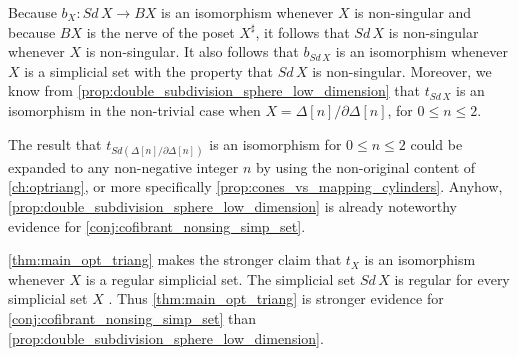 Because $b_X:Sd\, X\to BX$ is an isomorphism whenever $X$ is non-singular and because $BX$ is the nerve of the poset $X^\sharp$, it follows that $Sd\, X$ is non-singular whenever $X$ is non-singular. It also follows that $b_{Sd\, X}$ is an isomorphism whenever $X$ is a simplicial set with the property that $Sd\, X$ is non-singular. Moreover, we know from \cref{prop:double_subdivision_sphere_low_dimension} that $t_{Sd\, X}$ is an isomorphism in the non-trivial case when $X=\Delta [n]/\partial \Delta [n]$, for $0\leq n\leq 2$.

The result that $t_{Sd(\Delta [n]/\partial \Delta [n])}$ is an isomorphism for $0\leq n\leq 2$ could be expanded to any non-negative integer $n$ by using the non-original content of \cref{ch:optriang}, or more specifically \cref{prop:cones_vs_mapping_cylinders}. Anyhow, \cref{prop:double_subdivision_sphere_low_dimension} is already noteworthy evidence for \cref{conj:cofibrant_nonsing_simp_set}.

\cref{thm:main_opt_triang} makes the stronger claim that $t_X$ is an isomorphism whenever $X$ is a regular simplicial set. The simplicial set $Sd\, X$ is regular for every simplicial set $X$ \cite[Prop.~4.6.10]{FP90}. Thus \cref{thm:main_opt_triang} is stronger evidence for \cref{conj:cofibrant_nonsing_simp_set} than \cref{prop:double_subdivision_sphere_low_dimension}.

